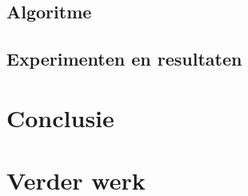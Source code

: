 \documentclass{article}
\begin{document}

\subsection{Algoritme}


\subsection{Experimenten en resultaten}


\section{Conclusie}


\section{Verder werk}






% 
% 
\end{document}
